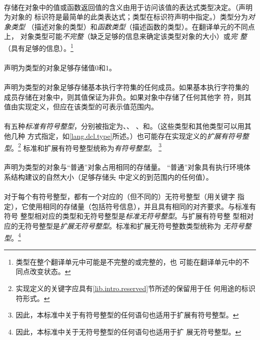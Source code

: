 {
\paragraph{}
存储在对象中的值或函数返回值的含义由用于访问该值的表达式类型决定。（声明为对象的
标识符是最简单的此类表达式；类型在标识符声明中指定。）类型分为\textit{对象类型}
（描述对象的类型）和\textit{函数类型}（描述函数的类型）。在翻译单元的不同点上，
对象类型可能\textit{不完整}（缺乏足够的信息来确定该类型对象的大小）或\textit{完
整}（具有足够的信息）。\footnote{类型在整个翻译单元中可能是不完整的或完整的，也
可能在翻译单元中的不同点改变状态。}

\paragraph{}
声明为类型的对象足够存储值$0$和$1$。

\paragraph{}
声明为类型的对象足够存储基本执行字符集的任何成员。如果基本执行字符集的
成员存储在对象中，则其值保证为非负。如果对象中存储了任何其他字
符，则其值由实现定义，但应在该类型的可表示值范围内。

\paragraph{}
有五种\textit{标准有符号整型}，分别被指定为、、
、和。（这些类型和其他类型可以用其他几种
方式指定，如\ref{lang.dcl.type}所述。）也可能存在实现定义的\textit{扩展有符号整
型}。\footnote{实现定义的关键字应具有\ref{lib.intro.reserved}节所述的保留用于任
何用途的标识符形式。} 标准和扩展有符号整型统称为\textit{有符号整型}。
\footnote{因此，本标准中关于有符号整型的任何语句也适用于扩展有符号整型。}

\paragraph{}
声明为类型的对象与``普通''对象占用相同的存储量。
``普通''对象具有执行环境体系结构建议的自然大小（足够存储头
中定义的到范围内的任何值）。

\paragraph{}
对于每个有符号整型，都有一个对应的（但不同的）无符号整型（用关键字
指定），它使用相同的存储量（包括符号信息），并且具有相同的对齐要求。与标准有符号
整型相对应的类型和无符号整型是\textit{标准无符号整型}。与扩展有符号整
型相对应的无符号整型是\textit{扩展无符号整型}。标准和扩展无符号整数类型统称为
\textit{无符号整型}。\footnote{因此，本标准中关于无符号整型的任何语句也适用于扩
展无符号整型。}

}
